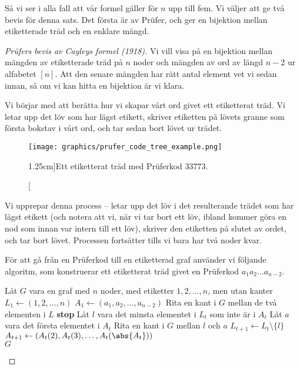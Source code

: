 \documentclass[nobib]{tufte-handout}
\begin{document}
Så vi ser i alla fall att vår formel gäller för $n$ upp till fem. Vi väljer att ge två bevis för denna sats. Det första är av Prüfer, och ger en bijektion mellan etiketterade träd och en enklare mängd.

\begin{proof}[Prüfers bevis av Cayleys formel (1918)]
    Vi vill visa på en bijektion mellan mängden av etiketterade träd på $n$ noder och mängden av ord av längd $n-2$ ur alfabetet $[n]$. Att den senare mängden har rätt antal element vet vi sedan innan, så om vi kan hitta en bijektion är vi klara.

    Vi börjar med att berätta hur vi skapar vårt ord givet ett etiketterat träd. Vi letar upp det löv som har lägst etikett, skriver etiketten på lövets granne som första bokstav i vårt ord, och tar sedan bort lövet ur trädet.

    \begin{figure}
        \centering
        \texttt{[image: graphics/prufer\_code\_tree\_example.png]}
        \caption[][1.25cm]{Ett etiketterat träd med Prüferkod $33773$.}
    \end{figure}

    Vi upprepar denna process -- letar upp det löv i det resulterande trädet som har lägst etikett (och notera att vi, när vi tar bort ett löv, ibland kommer göra en nod som innan var intern till ett löv), skriver den etiketten på slutet av ordet, och tar bort lövet. Processen fortsätter tills vi bara har två noder kvar.

    För att gå från en Prüferkod till en etiketterad graf använder vi följande algoritm, som konstruerar ett etiketterat träd givet en Prüferkod $a_1a_2\ldots a_{n-2}$.

    \begin{algorithm}
        \caption{Konstruktion av träd från Prüferkoder}\label{alg:constr_tree_from_prufer_code}
        \begin{algorithmic}
            \State Låt $G$ vara en graf med $n$ noder, med etiketter $1, 2, \ldots, n$, men utan kanter
            \State $L_1 \gets (1, 2, \ldots, n)$
            \State $A_1 \gets (a_1, a_2, \ldots, a_{n-2})$
            \State Rita en kant i $G$ mellan de två elementen i $L$
            \State \textbf{stop}
            \Else
            \State Låt $l$ vara det minsta elementet i $L_t$ som inte är i $A_t$
            \State Låt $a$ vara det första elementet i $A_t$
            \State Rita en kant i $G$ mellan $l$ och $a$
            \State $L_{t+1} \gets L_t \setminus \{l\}$
            \State $A_{t+1} \gets (A_t(2), A_t(3), \ldots, A_t(\abs{A_t}))$
            \EndIf
            \EndFor\\
            \Return $G$
        \end{algorithmic}
    \end{algorithm}


\end{proof}
\end{document}
